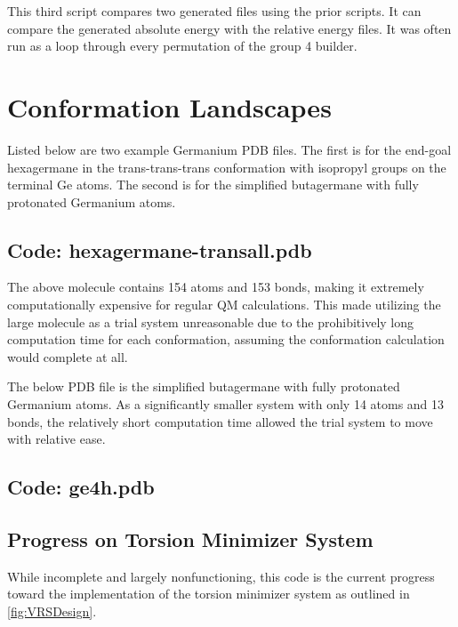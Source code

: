 This third script compares two generated files using the prior scripts. It can compare the generated absolute energy with the relative energy files. It was often run as a loop through every permutation of the group 4 builder.




\chapter{Conformation Landscapes}
\label{ch:App:ConfLand}

Listed below are two example Germanium PDB files. The first is for the end-goal hexagermane in the trans-trans-trans conformation with isopropyl groups on the terminal Ge atoms. The second is for the simplified butagermane with fully protonated Germanium atoms.

\section{Code: hexagermane-transall.pdb}



The above molecule contains 154 atoms and 153 bonds, making it extremely computationally expensive for regular QM calculations. This made utilizing the large molecule as a trial system unreasonable due to the prohibitively long computation time for each conformation, assuming the conformation calculation would complete at all.

The below PDB file is the simplified butagermane with fully protonated Germanium atoms. As a significantly smaller system with only 14 atoms and 13 bonds, the relatively short computation time allowed the trial system to move with relative ease.

\section{Code: ge4h.pdb}



\section{Progress on Torsion Minimizer System}

While incomplete and largely nonfunctioning, this code is the current progress toward the implementation of the torsion minimizer system as outlined in \ref{fig:VRSDesign}.


